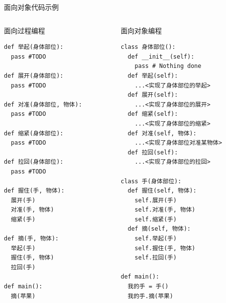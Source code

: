 \documentclass{beamer}
\begin{document}
    \begin{frame}[fragile]{面向对象代码示例}
      \begin{columns}
        \begin{column}{0.4\textwidth}
          \begin{block}{\tiny 面向过程编程}
            \begin{lstlisting}
def 举起(身体部位):
  pass #TODO   

def 展开(身体部位):
  pass #TODO 

def 对准(身体部位, 物体):
  pass #TODO 

def 缩紧(身体部位):
  pass #TODO 

def 拉回(身体部位):
  pass #TODO 

def 握住(手, 物体):
  展开(手)
  对准(手, 物体)
  缩紧(手)

def 摘(手, 物体):
  举起(手)
  握住(手, 物体)
  拉回(手)

def main():
  摘(苹果)
            \end{lstlisting}
          \end{block}
        \end{column}
        \begin{column}{0.4\textwidth}
          \begin{block}{\tiny 面向对象编程}
            \begin{lstlisting}
class 身体部位():
  def __init__(self):
    pass # Nothing done
  def 举起(self):
    ...<实现了身体部位的举起>
  def 展开(self):
    ...<实现了身体部位的展开>
  def 缩紧(self):
    ...<实现了身体部位的缩紧>
  def 对准(self, 物体):
    ...<实现了身体部位对准某物体>
  def 拉回(self):
    ...<实现了身体部位的拉回>

class 手(身体部位):
  def 握住(self, 物体):
    self.展开(手)
    self.对准(手, 物体)
    self.缩紧(手)
  def 摘(self, 物体):
    self.举起(手)
    self.握住(手, 物体)
    self.拉回(手)
  
def main():
  我的手 = 手()
  我的手.摘(苹果)
            \end{lstlisting}
          \end{block}
        \end{column}
      \end{columns}
    \end{frame}
\end{document}
